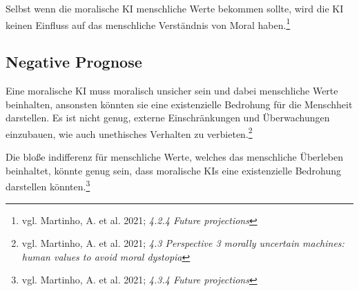 Selbst wenn die moralische KI menschliche Werte bekommen sollte, wird die KI keinen
Einfluss auf das menschliche Verständnis von Moral haben.\footnote{vgl. Martinho, A. et al. 2021; \textit{4.2.4 Future projections}}

\subsection{Negative Prognose}\label{subsec::negative prognose}

Eine moralische KI muss moralisch unsicher sein und dabei menschliche Werte beinhalten, ansonsten
könnten sie eine existenzielle Bedrohung für die Menschheit darstellen.
Es ist nicht genug, externe Einschränkungen und Überwachungen einzubauen, wie auch unethisches Verhalten
zu verbieten.\footnote{vgl. Martinho, A. et al. 2021; \textit{4.3 Perspective 3 morally uncertain machines: human values to avoid moral dystopia}}

Die bloße indifferenz für menschliche Werte, welches das menschliche Überleben beinhaltet, könnte
genug sein, dass moralische KIs eine existenzielle Bedrohung darstellen könnten.\footnote{vgl. Martinho, A. et al. 2021; \textit{4.3.4 Future projections}}